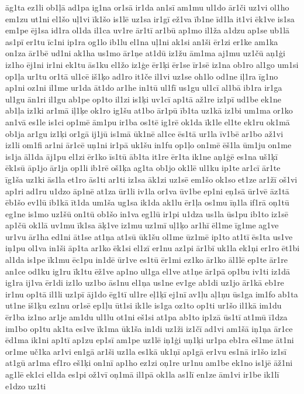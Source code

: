 {āg1ta
ez1li
ob1ļā
ad1pa
ig1na
or1sā
ir1da
an1sī
am1mu
ul1do
ār1či
uz1vi
ol1ho
em1zu
ut1ni
el1šo
uļ1vi
īk1šo
is1lē
uz1sa
ir1gī
ež1va
īb1ne
īd1la
it1vi
ēk1ve
is1sa
em1pe
ēj1sa
id1ra
ol1da
il1ca
uv1re
ār1tī
ar1bū
ap1mo
il1ža
a1dzu
ap1se
ub1lā
as1pī
er1tu
īc1ni
ip1ra
og1lo
ib1lu
el1na
uļ1ni
ak1si
an1ši
ēr1zi
er1ke
am1ka
on1za
ār1bē
ud1ni
ak1ha
us1mo
ār1ņe
at1dū
iz1žu
ām1ma
aj1mu
uz1čū
aņ1ģi
iz1ho
ēj1ni
ir1ni
ek1tu
ās1ku
el1žo
iz1ģe
ēr1ķi
ēr1se
īr1sē
iz1na
ob1ro
al1go
um1si
op1ļa
ur1tu
or1tā
ul1cē
iš1ķo
ad1ro
it1če
il1vi
uz1se
oh1lo
od1ne
iļ1ra
īg1no
ap1ni
oz1ni
il1me
ur1da
āt1do
ar1he
in1tū
ul1fī
us1gu
ul1cī
al1bā
ib1ra
ir1ga
ul1gu
ān1ri
il1gu
ab1pe
op1to
il1zi
is1ķi
uv1cī
ap1tā
až1re
iz1pī
ud1be
ek1ne
ab1ļa
iz1ki
ar1mā
iļ1ķe
ok1ro
ig1šu
at1bo
ār1pū
īb1ta
uz1kā
iz1bi
um1ma
or1ko
an1vā
es1le
is1ci
op1mē
ām1pu
ir1ba
os1tē
ig1rē
ok1da
īk1le
el1te
ek1ru
ok1mā
ob1ja
ar1gu
iz1ķi
or1gā
ij1jū
is1mā
ūk1nē
al1ce
ēs1tā
ur1la
īv1bē
ar1bo
až1vi
iz1li
om1fi
ar1ni
ār1cē
uņ1ni
ir1pā
uk1šu
in1fu
op1ļo
on1mē
ēš1la
ūm1ju
on1me
is1ja
āl1da
āj1pu
el1zi
ēr1ko
īs1tū
āb1ta
it1re
ēr1ta
ik1ne
aņ1ģē
es1na
uš1ķī
ēk1sū
āp1jo
ār1ja
op1li
ib1rē
oš1ķa
ag1ta
ob1jo
ok1lē
ul1ku
ip1te
ar1cī
ār1te
īg1ša
uz1ki
ās1la
et1ro
ās1ti
ar1ti
iz1sa
āk1zi
uz1sē
em1šo
ok1so
et1ze
ar1žī
oš1vi
ap1ri
ad1ru
u1dzo
āp1nē
at1za
ūr1li
iv1la
or1va
ūv1be
ep1ni
eņ1sā
ūr1vē
āz1tā
ēb1šo
ev1lū
ib1kā
īt1da
um1ša
ug1sa
ik1da
ak1lu
ēr1ļa
os1mu
īņ1la
if1rā
oņ1tū
eg1ne
is1mo
uz1šū
on1tū
ob1šo
in1va
eg1lū
ir1pi
u1dza
us1la
ūs1pu
ib1to
iz1sē
ap1čū
ok1lā
uv1mu
īk1sa
āķ1ve
iz1mu
uz1mī
uļ1ķo
ar1hī
ēl1me
īg1me
ag1ve
ur1vu
ār1ha
ed1ni
āt1se
at1ņa
at1sū
ūk1šu
ol1me
ūz1mē
ip1to
at1tī
ēs1ta
us1ve
iņ1pu
ol1va
in1ši
āp1ta
ar1ko
ēk1si
el1zī
er1nu
az1pi
ār1bī
uk1la
ek1ņi
er1ro
ēt1bi
al1da
is1pe
īk1mu
ēc1pu
in1dē
ūr1ve
es1tū
ēr1mi
ez1ko
ār1ko
āl1lē
ep1te
ār1re
an1ce
od1ku
ig1ru
īk1tu
ēž1ve
ap1no
ul1ga
el1ve
at1ņe
ār1pā
op1bu
iv1ti
iz1dā
ig1ra
ij1va
ēr1di
iz1lo
uz1bo
ās1nu
el1ņa
us1ne
ev1ge
ab1di
uz1jo
ār1kā
eb1re
ir1nu
op1tā
il1li
uz1pī
āj1do
ēg1tī
ul1re
eļ1ķī
ej1nī
av1ļu
aļ1ņu
ūs1ga
im1fo
ab1ta
ut1ne
iš1ķu
ez1nu
or1sē
ep1ļu
ūt1si
ik1le
is1ga
oz1to
op1ti
ur1šo
il1kā
im1du
ēr1ba
iz1no
ar1je
am1du
ul1lu
ot1ni
eš1si
at1pa
ab1to
ip1zā
ūs1tī
at1mū
ī1dza
im1bo
op1tu
ak1ta
es1ve
īk1ma
ūk1ša
in1di
uz1ži
iz1čī
ad1vi
am1šā
iņ1ņa
ār1ce
ēd1ma
ik1ni
ap1tī
ap1zu
ep1sī
am1pe
uz1lē
iņ1ģi
uņ1ķi
ur1pa
eb1ra
eš1me
āt1ni
or1me
uč1ka
ar1vi
en1gā
ar1ši
uz1la
es1kā
uk1ņī
ap1gā
er1vu
es1nā
ir1šo
iz1sī
at1gū
ar1ma
ef1ro
eš1ķi
on1nī
ap1ho
ez1zi
oņ1re
ur1nu
am1be
ek1no
is1jē
āž1ni
ag1lē
ek1ci
el1da
es1pi
ož1vī
oņ1mā
il1pā
ok1la
as1lī
en1ze
ām1vi
ir1be
ik1lī
e1dzo
uz1ti
}

